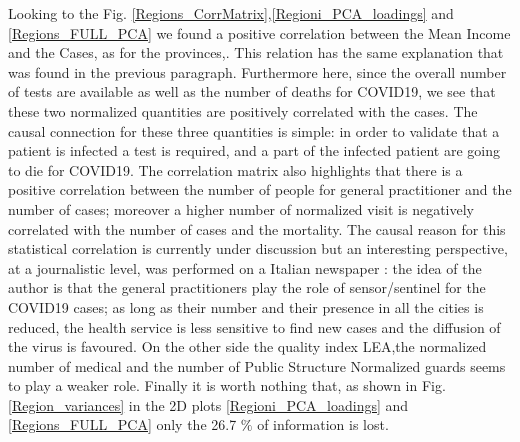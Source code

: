 \documentclass[
12pt, %
a4paper, %
oneside, %
headinclude,footinclude, %
BCOR5mm, %
]{scrartcl}
\begin{document}
Looking to the Fig. \ref{Regions_CorrMatrix},\ref{Regioni_PCA_loadings} and \ref{Regions_FULL_PCA} we found a positive correlation between the Mean Income and the Cases, as for the provinces,. This relation has the same explanation that was found in the previous paragraph. Furthermore here, since the overall number of tests are available as well as the number of deaths for COVID19, we see that these two normalized quantities are positively correlated with the cases. The causal connection for these three quantities is simple: in order to validate that a patient is infected a test is required, and a part of the infected patient are going to die for COVID19. The correlation matrix also highlights that there is a positive correlation between the number of people for general practitioner and the number of cases; moreover a higher number of normalized visit is negatively correlated with the number of cases and the mortality. The causal reason for this statistical correlation is currently under discussion but an interesting perspective, at a journalistic level, was performed on a Italian newspaper \cite{24plus}: the idea of the author is that the general practitioners play the role of sensor/sentinel for the COVID19 cases; as long as their number and their presence in all the cities is reduced, the health service is less sensitive to find new cases and the diffusion of the virus is favoured.  On the other side the quality index LEA,the normalized number of medical and the number of Public Structure Normalized  guards seems to play a weaker role. Finally it is worth nothing that, as shown in Fig. \ref{Region_variances} in the 2D plots \ref{Regioni_PCA_loadings} and \ref{Regions_FULL_PCA} only the 26.7 $ \% $ of information is lost.
\end{document}
